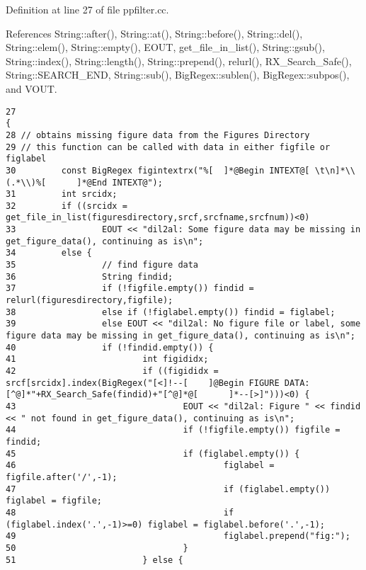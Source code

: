 Definition at line 27 of file ppfilter.cc.

References String::after(), String::at(), String::before(), String::del(), String::elem(), String::empty(), EOUT, get\_\-file\_\-in\_\-list(), String::gsub(), String::index(), String::length(), String::prepend(), relurl(), RX\_\-Search\_\-Safe(), String::SEARCH\_\-END, String::sub(), Big\-Regex::sublen(), Big\-Regex::subpos(), and VOUT.



\footnotesize\begin{verbatim}27                                                                                                                                                                                     {
28 // obtains missing figure data from the Figures Directory
29 // this function can be called with data in either figfile or figlabel
30         const BigRegex figintextrx("%[  ]*@Begin INTEXT@[ \t\n]*\\(.*\\)%[      ]*@End INTEXT@");
31         int srcidx;
32         if ((srcidx = get_file_in_list(figuresdirectory,srcf,srcfname,srcfnum))<0)
33                 EOUT << "dil2al: Some figure data may be missing in get_figure_data(), continuing as is\n";
34         else {
35                 // find figure data
36                 String findid;
37                 if (!figfile.empty()) findid = relurl(figuresdirectory,figfile);
38                 else if (!figlabel.empty()) findid = figlabel;
39                 else EOUT << "dil2al: No figure file or label, some figure data may be missing in get_figure_data(), continuing as is\n";
40                 if (!findid.empty()) {
41                         int figididx;
42                         if ((figididx = srcf[srcidx].index(BigRegex("[<]!--[    ]@Begin FIGURE DATA:[^@]*"+RX_Search_Safe(findid)+"[^@]*@[      ]*--[>]")))<0) {
43                                 EOUT << "dil2al: Figure " << findid << " not found in get_figure_data(), continuing as is\n";
44                                 if (!figfile.empty()) figfile = findid;
45                                 if (figlabel.empty()) {
46                                         figlabel = figfile.after('/',-1);
47                                         if (figlabel.empty()) figlabel = figfile;
48                                         if (figlabel.index('.',-1)>=0) figlabel = figlabel.before('.',-1);
49                                         figlabel.prepend("fig:");
50                                 }
51                         } else {

\end{verbatim}
